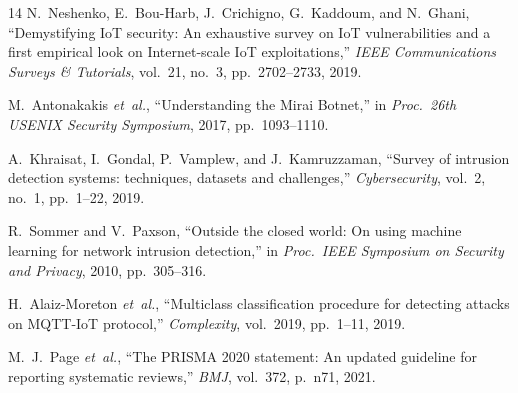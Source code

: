 \documentclass[12pt,a4paper]{article}
\begin{document}
\begin{thebibliography}{14}
N.~Neshenko, E.~Bou-Harb, J.~Crichigno, G.~Kaddoum, and N.~Ghani,
``Demystifying IoT security: An exhaustive survey on IoT vulnerabilities and a first empirical look on Internet-scale IoT exploitations,''
\emph{IEEE Communications Surveys \& Tutorials}, vol.~21, no.~3, pp.~2702--2733, 2019.

M.~Antonakakis \emph{et~al.},
``Understanding the Mirai Botnet,''
in \emph{Proc.\ 26th USENIX Security Symposium}, 2017, pp.~1093--1110.

A.~Khraisat, I.~Gondal, P.~Vamplew, and J.~Kamruzzaman,
``Survey of intrusion detection systems: techniques, datasets and challenges,''
\emph{Cybersecurity}, vol.~2, no.~1, pp.~1--22, 2019.

R.~Sommer and V.~Paxson,
``Outside the closed world: On using machine learning for network intrusion detection,''
in \emph{Proc.\ IEEE Symposium on Security and Privacy}, 2010, pp.~305--316.

H.~Alaiz-Moreton \emph{et~al.},
``Multiclass classification procedure for detecting attacks on MQTT-IoT protocol,''
\emph{Complexity}, vol.~2019, pp.~1--11, 2019.

M.~J.~Page \emph{et~al.},
``The PRISMA 2020 statement: An updated guideline for reporting systematic reviews,''
\emph{BMJ}, vol.~372, p.~n71, 2021.

\end{thebibliography}
\end{document}
